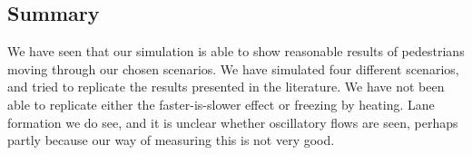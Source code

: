 \subsection{Summary}
We have seen that our simulation is able to show reasonable results of 
pedestrians moving through our chosen scenarios. We have simulated four 
different scenarios, and tried to replicate the results presented in the 
literature. We have not been able to replicate either the faster-is-slower 
effect or freezing by heating. Lane formation we do see, and it is unclear 
whether oscillatory flows are seen, perhaps partly because our way of 
measuring this is not very good.
